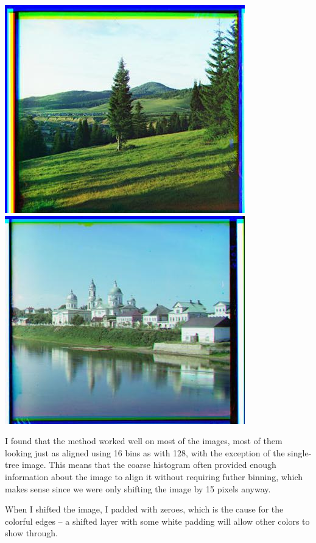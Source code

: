\documentclass[12pt]{article}
\begin{document}
\begin{center}
\includegraphics[scale=0.6]{processed/processed-128-00600v.jpg}~
\includegraphics[scale=0.6]{processed/processed-64-01167v.jpg}
\end{center}

I found that the method worked well on most of the images, most of them looking just as aligned using 16 bins as with 128, with the exception of the single-tree image. This means that the coarse histogram often provided enough information about the image to align it without requiring futher binning, which makes sense since we were only shifting the image by 15 pixels anyway.

When I shifted the image, I padded with zeroes, which is the cause for the colorful edges -- a shifted layer with some white padding will allow other colors to show through.
\end{document}

